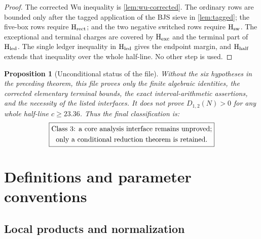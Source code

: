 \documentclass[11pt]{article}
\newtheorem{proposition}[theorem]{Proposition}
\theoremstyle{definition}
\begin{document}
\begin{proof}
The corrected Wu inequality is \cref{lem:wu-corrected}.  The ordinary rows
are bounded only after the tagged application of the BJS sieve in
\cref{lem:tagged}; the five-box rows require \(\mathrm{H}_{\rm rect}\);
and the two negative switched rows require \(\mathrm{H}_{\rm sw}\).
The exceptional and terminal charges are covered by
\(\mathrm{H}_{\rm exc}\) and the terminal part of \(\mathrm{H}_{\rm led}\).
The single ledger inequality in \(\mathrm{H}_{\rm led}\) gives the endpoint
margin, and \(\mathrm{H}_{\rm half}\) extends that inequality over the
whole half-line.  No other step is used.
\end{proof}

\begin{proposition}[Unconditional status of the file]
\label{prop:status}
Without the six hypotheses in the preceding theorem, this file proves only
the finite algebraic identities, the corrected elementary terminal bounds,
the exact interval-arithmetic assertions, and the necessity of the listed
interfaces.  It does not prove \(D_{1,2}(N)>0\) for any whole half-line
\(c\geq23.36\).  Thus the final classification is:
\[
\boxed{\begin{gathered}
\text{\rm Class 3: a core analysis interface remains unproved;}\\
\text{\rm only a conditional reduction theorem is retained.}
\end{gathered}}
\]
\end{proposition}

\section{Definitions and parameter conventions}
\label{sec:definitions}

\subsection{Local products and normalization}
\label{sec:products}
\end{document}
